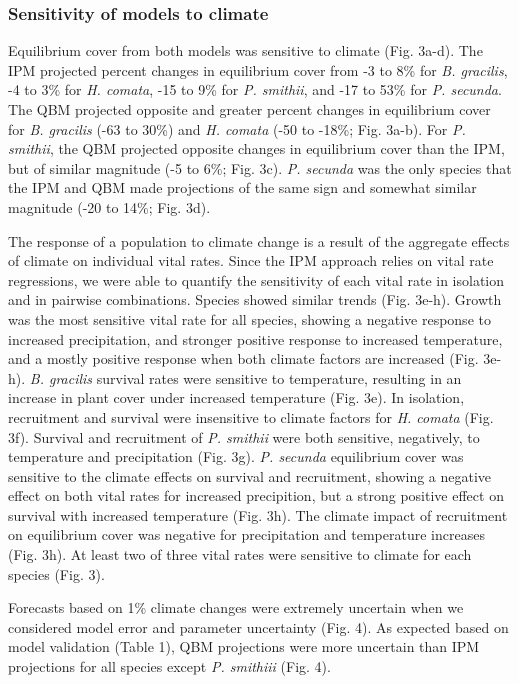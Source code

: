 \documentclass[12pt,]{article}
\begin{document}
\subsubsection{Sensitivity of models to
climate}\label{sensitivity-of-models-to-climate}

Equilibrium cover from both models was sensitive to climate (Fig. 3a-d).
The IPM projected percent changes in equilibrium cover from -3 to 8\%
for \emph{B. gracilis}, -4 to 3\% for \emph{H. comata}, -15 to 9\% for
\emph{P. smithii}, and -17 to 53\% for \emph{P. secunda}. The QBM
projected opposite and greater percent changes in equilibrium cover for
\emph{B. gracilis} (-63 to 30\%) and \emph{H. comata} (-50 to -18\%;
Fig. 3a-b). For \emph{P. smithii}, the QBM projected opposite changes in
equilibrium cover than the IPM, but of similar magnitude (-5 to 6\%;
Fig. 3c). \emph{P. secunda} was the only species that the IPM and QBM
made projections of the same sign and somewhat similar magnitude (-20 to
14\%; Fig. 3d).

The response of a population to climate change is a result of the
aggregate effects of climate on individual vital rates. Since the IPM
approach relies on vital rate regressions, we were able to quantify the
sensitivity of each vital rate in isolation and in pairwise
combinations. Species showed similar trends (Fig. 3e-h). Growth was the
most sensitive vital rate for all species, showing a negative response
to increased precipitation, and stronger positive response to increased
temperature, and a mostly positive response when both climate factors
are increased (Fig. 3e-h). \emph{B. gracilis} survival rates were
sensitive to temperature, resulting in an increase in plant cover under
increased temperature (Fig. 3e). In isolation, recruitment and survival
were insensitive to climate factors for \emph{H. comata} (Fig. 3f).
Survival and recruitment of \emph{P. smithii} were both sensitive,
negatively, to temperature and precipitation (Fig. 3g). \emph{P.
secunda} equilibrium cover was sensitive to the climate effects on
survival and recruitment, showing a negative effect on both vital rates
for increased precipition, but a strong positive effect on survival with
increased temperature (Fig. 3h). The climate impact of recruitment on
equilibrium cover was negative for precipitation and temperature
increases (Fig. 3h). At least two of three vital rates were sensitive to
climate for each species (Fig. 3).

Forecasts based on 1\% climate changes were extremely uncertain when we
considered model error and parameter uncertainty (Fig. 4). As expected
based on model validation (Table 1), QBM projections were more uncertain
than IPM projections for all species except \emph{P. smithiii} (Fig. 4).
\end{document}
